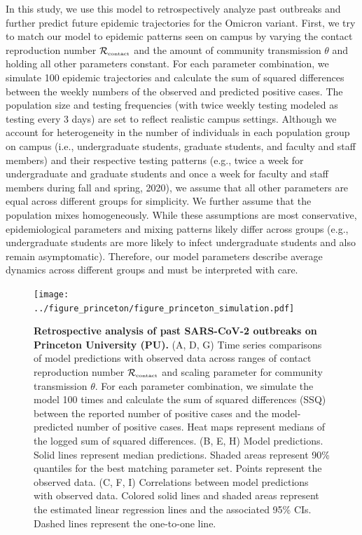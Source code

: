 \documentclass[12pt]{article}
\newcommand{\Rx}[1]{\ensuremath{{\mathcal R}_{#1}}}
\newcommand{\Rc}{\Rx{\textrm{\tiny{contact}}}}
\begin{document}
In this study, we use this model to retrospectively analyze past outbreaks and further predict future epidemic trajectories for the Omicron variant.
First, we try to match our model to epidemic patterns seen on campus by varying the contact reproduction number $\Rc$ and the amount of community transmission $\theta$ and holding all other parameters constant.
For each parameter combination, we simulate 100 epidemic trajectories and calculate the sum of squared differences between the weekly numbers of the observed and predicted positive cases.
The population size and testing frequencies (with twice weekly testing modeled as testing every 3 days) are set to reflect realistic campus settings.
Although we account for heterogeneity in the number of individuals in each population group on campus (i.e., undergraduate students, graduate students, and faculty and staff members) and their respective testing patterns (e.g., twice a week for undergraduate and graduate students and once a week for faculty and staff members during fall and spring, 2020), we assume that all other parameters are equal across different groups for simplicity. 
We further assume that the population mixes homogeneously.
While these assumptions are most conservative, epidemiological parameters  and mixing patterns likely differ across groups (e.g., undergraduate students are more likely to infect undergraduate students and also remain asymptomatic).
Therefore, our model parameters describe average dynamics across different groups and must be interpreted with care.

\begin{figure}[!th]
\texttt{[image: ../figure\_princeton/figure\_princeton\_simulation.pdf]}
\caption{
\textbf{Retrospective analysis of past SARS-CoV-2 outbreaks on Princeton University (PU).}
(A, D, G) Time series comparisons of model predictions with observed data across ranges of contact reproduction number $\Rc$ and scaling parameter for community transmission $\theta$.
For each parameter combination, we simulate the model 100 times and calculate the sum of squared differences (SSQ) between the reported number of positive cases and the model-predicted number of positive cases. 
Heat maps represent medians of the logged sum of squared differences.
(B, E, H) Model predictions. 
Solid lines represent median predictions.
Shaded areas represent 90\% quantiles for the best matching parameter set.
Points represent the observed data.
(C, F, I) Correlations between model predictions with observed data.
Colored solid lines and shaded areas represent the estimated linear regression lines and the associated 95\% CIs.
Dashed lines represent the one-to-one line.
\label{fig:matching}
}
\end{figure}
\end{document}
